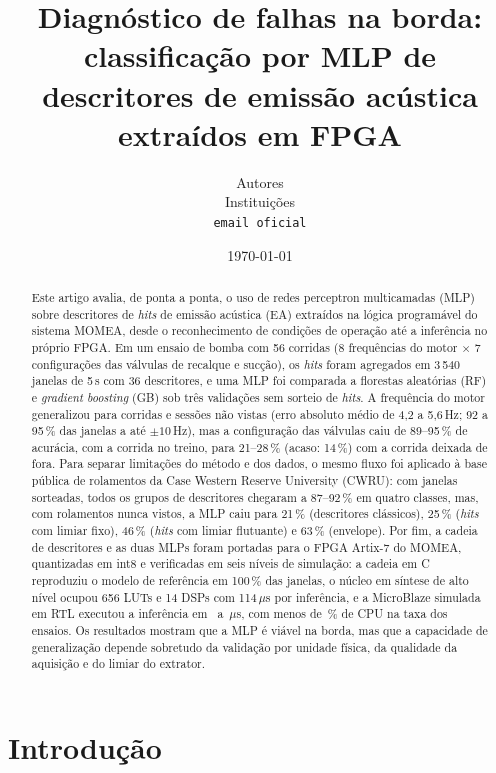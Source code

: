 \documentclass[12pt]{article}
\title{\textbf{Diagnóstico de falhas na borda: classificação por MLP de descritores de emissão acústica extraídos em FPGA}}
\date{\today}
\author{Autores \\ Instituições \\ \texttt{email oficial}}
\begin{document}
\maketitle

\begin{abstract}
Este artigo avalia, de ponta a ponta, o uso de redes perceptron multicamadas (MLP) sobre descritores de \textit{hits} de emissão acústica (EA) extraídos na lógica programável do sistema MOMEA, desde o reconhecimento de condições de operação até a inferência no próprio FPGA. Em um ensaio de bomba com 56 corridas (8 frequências do motor \(\times\) 7 configurações das válvulas de recalque e sucção), os \textit{hits} foram agregados em 3\,540 janelas de 5\,s com 36 descritores, e uma MLP foi comparada a florestas aleatórias (RF) e \textit{gradient boosting} (GB) sob três validações sem sorteio de \textit{hits}. A frequência do motor generalizou para corridas e sessões não vistas (erro absoluto médio de 4,2 a 5,6\,Hz; 92 a 95\,\% das janelas a até \(\pm 10\)\,Hz), mas a configuração das válvulas caiu de 89--95\,\% de acurácia, com a corrida no treino, para 21--28\,\% (acaso: 14\,\%) com a corrida deixada de fora. Para separar limitações do método e dos dados, o mesmo fluxo foi aplicado à base pública de rolamentos da Case Western Reserve University (CWRU): com janelas sorteadas, todos os grupos de descritores chegaram a 87--92\,\% em quatro classes, mas, com rolamentos nunca vistos, a MLP caiu para 21\,\% (descritores clássicos), 25\,\% (\textit{hits} com limiar fixo), 46\,\% (\textit{hits} com limiar flutuante) e 63\,\% (envelope). Por fim, a cadeia de descritores e as duas MLPs foram portadas para o FPGA Artix-7 do MOMEA, quantizadas em int8 e verificadas em seis níveis de simulação: a cadeia em C reproduziu o modelo de referência em 100\,\% das janelas, o núcleo em síntese de alto nível ocupou 656 LUTs e 14 DSPs com 114\,\(\mu\)s por inferência, e a MicroBlaze simulada em RTL executou a inferência em \mbMlpIntFpuUs\ a \mbMlpIntSoftUs\,\(\mu\)s, com menos de \mbCargaEnsaioMax\,\% de CPU na taxa dos ensaios. Os resultados mostram que a MLP é viável na borda, mas que a capacidade de generalização depende sobretudo da validação por unidade física, da qualidade da aquisição e do limiar do extrator.
\end{abstract}

\section{Introdução}
\label{sec:introducao}
\end{document}
